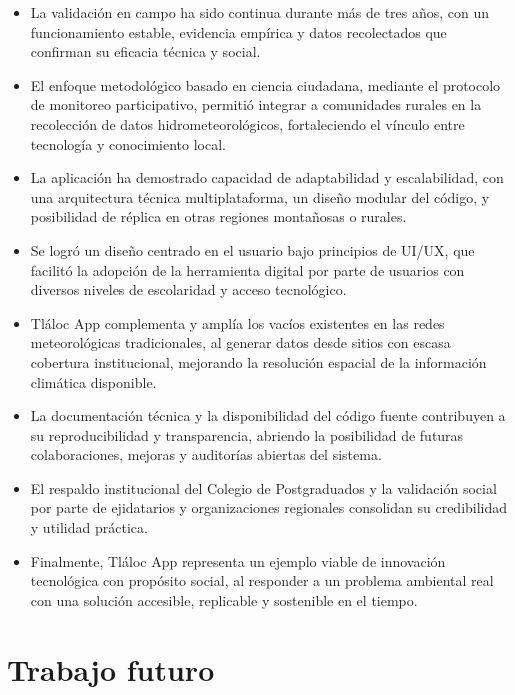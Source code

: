 \begin{itemize}
  \item La validación en campo ha sido continua durante más de tres años, con un funcionamiento estable, evidencia empírica y datos recolectados que confirman su eficacia técnica y social.

  \item El enfoque metodológico basado en ciencia ciudadana, mediante el protocolo de monitoreo participativo, permitió integrar a comunidades rurales en la recolección de datos hidrometeorológicos, fortaleciendo el vínculo entre tecnología y conocimiento local.

  \item La aplicación ha demostrado capacidad de adaptabilidad y escalabilidad, con una arquitectura técnica multiplataforma, un diseño modular del código, y posibilidad de réplica en otras regiones montañosas o rurales.

  \item Se logró un diseño centrado en el usuario bajo principios de UI/UX, que facilitó la adopción de la herramienta digital por parte de usuarios con diversos niveles de escolaridad y acceso tecnológico.

  \item Tláloc App complementa y amplía los vacíos existentes en las redes meteorológicas tradicionales, al generar datos desde sitios con escasa cobertura institucional, mejorando la resolución espacial de la información climática disponible.

  \item La documentación técnica y la disponibilidad del código fuente contribuyen a su reproducibilidad y transparencia, abriendo la posibilidad de futuras colaboraciones, mejoras y auditorías abiertas del sistema.

  \item El respaldo institucional del Colegio de Postgraduados y la validación social por parte de ejidatarios y organizaciones regionales consolidan su credibilidad y utilidad práctica.

  \item Finalmente, Tláloc App representa un ejemplo viable de innovación tecnológica con propósito social, al responder a un problema ambiental real con una solución accesible, replicable y sostenible en el tiempo.
\end{itemize}

\section{Trabajo futuro}

